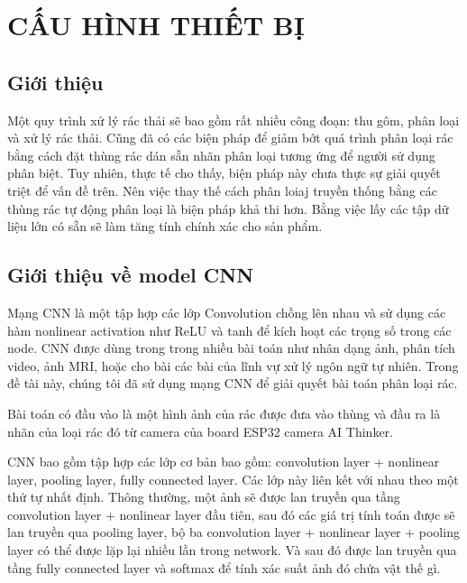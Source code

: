 

\chapter{CẤU HÌNH THIẾT BỊ}
\section{Giới thiệu}
Một quy trình xử lý rác thải sẽ bao gồm rất nhiều công đoạn: thu gôm, phân loại và xử lý rác thải.
Cũng đã có các biện pháp để giảm bớt quá trình phân loại rác bằng cách đặt thùng rác dán sẵn nhãn phân loại tương ứng để người sử dụng phân biệt.
Tuy nhiên, thực tế cho thấy, biện pháp này chưa thực sự giải quyết triệt để vấn đề trên. 
Nên việc thay thế cách phân loiaj truyền thống bằng các thùng rác tự động phân loại là biện pháp khả thi hơn.
Bằng việc lấy các tập dữ liệu lớn có sẵn sẽ làm tăng tính chính xác cho sản phẩm. 

\section{Giới thiệu về model CNN}
Mạng CNN là một tập hợp các lớp Convolution chồng lên nhau và sử dụng các hàm nonlinear activation như ReLU và tanh để kích hoạt các trọng số trong các node. 
CNN được dùng trong trong nhiều bài toán như nhân dạng ảnh, phân tích video, ảnh MRI, hoặc cho bài các bài của lĩnh vự xử lý ngôn ngữ tự nhiên. Trong đề tài này, chúng tôi đã sử dụng mạng CNN để giải quyết bài toán phân loại rác.

Bài toán có đầu vào là một hình ảnh của rác được đưa vào thùng và đầu ra là nhãn của loại rác đó từ camera của board ESP32 camera AI Thinker.

CNN bao gồm tập hợp các lớp cơ bản bao gồm: convolution layer + nonlinear layer, pooling layer, fully connected layer. 
Các lớp này liên kết với nhau theo một thứ tự nhất định. Thông thường, một ảnh sẽ được lan truyền qua tầng convolution layer + nonlinear layer đầu tiên, sau đó các giá trị tính toán được sẽ lan truyền qua pooling layer, bộ ba convolution layer + nonlinear layer + pooling layer có thể được lặp lại nhiều lần trong network. Và sau đó được lan truyền qua tầng fully connected layer và softmax để tính xác suất ảnh đó chứa vật thế gì.

